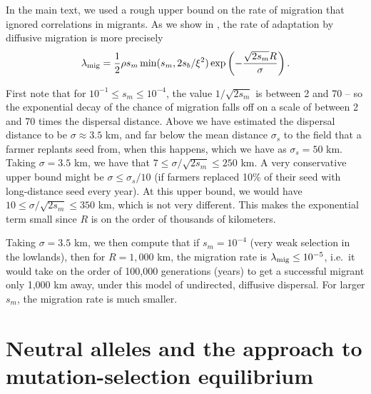 In the main text, we used a rough upper bound on the rate of migration
that ignored correlations in migrants.
As we show in \citet{ralph2014convergent}, 
the rate of adaptation by diffusive migration is more precisely
\begin{align*}
  \lambda_{\text{mig}} = \frac{1}{2} \rho s_m \min(s_m,2s_b/\xi^2) \exp\left(- \frac{\sqrt{2 s_m}R}{\sigma} \right) .
\end{align*}


First note that for $10^{-1} \le s_m \le 10^{-4}$, the value $1/\sqrt{2s_m}$ is between 2 and 70 --
so the exponential decay of the chance of migration falls off on a scale of between 2 and 70 times the dispersal distance.
Above we have estimated the dispersal distance to be $\sigma \approx 3.5$ km,
and far below the mean distance $\sigma_s$ to the field that a farmer replants seed from, when this happens,
which we have as $\sigma_s = 50$ km.
Taking $\sigma=3.5$ km, we have that $7 \le \sigma/\sqrt{2s_m} \le 250$ km.
A very conservative upper bound might be $\sigma \le \sigma_s/10$ (if farmers replaced 10\% of their seed with long-distance seed every year).
At this upper bound, we would have $10 \le \sigma/\sqrt{2s_m} \le 350$ km,
which is not very different.
This makes the exponential term small since $R$ is on the order of thousands of kilometers.


Taking $\sigma=3.5$ km, we then compute that 
if $s_m = 10^{-4}$ (very weak selection in the lowlands), then for $R=1,000$ km, the migration rate is $\lambda_{\text{mig}} \le 10^{-5}$,
i.e.\ it would take on the order of 100,000 generations (years) to get a successful migrant only 1,000 km away,
under this model of undirected, diffusive dispersal.
For larger $s_m$, the migration rate is much smaller.



\section{Neutral alleles and the approach to mutation-selection equilibrium}

